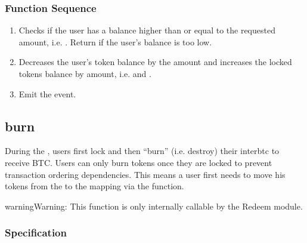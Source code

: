 \documentclass[a4paper,10pt,english]{sphinxmanual}
\begin{document}
\subsubsection{Function Sequence}
\label{\detokenize{spec/treasury:id7}}\begin{enumerate}
%
\item {} 
Checks if the user has a balance higher than or equal to the requested amount, i.e. . Return  if the user’s balance is too low.

\item {} 
Decreases the user’s token balance by the amount and increases the locked tokens balance by amount, i.e.  and .

\item {} 
Emit the  event.

\end{enumerate}


\subsection{burn}
\label{\detokenize{spec/treasury:burn}}\label{\detokenize{spec/treasury:id8}}
During the {\hyperref[\detokenize{spec/redeem:redeem-protocol}]{}}, users first lock and then “burn” (i.e. destroy) their interbtc to receive BTC. Users can only burn tokens once they are locked to prevent transaction ordering dependencies. This means a user first needs to move his tokens from the  to the  mapping via the {\hyperref[\detokenize{spec/treasury:lock}]{}} function.

\begin{sphinxadmonition}{warning}{Warning:}
This function is only internally callable by the Redeem module.
\end{sphinxadmonition}


\subsubsection{Specification}
\label{\detokenize{spec/treasury:id9}}
\end{document}
